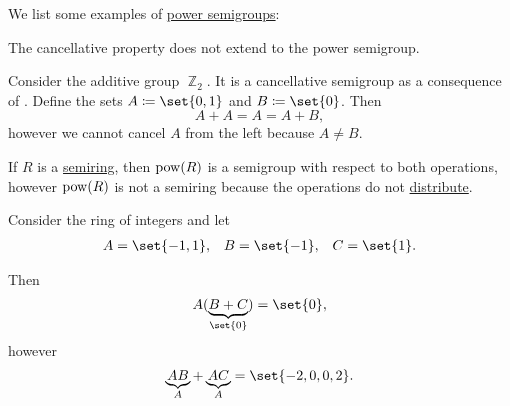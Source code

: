 \begin{example}\label{ex:def:power_semigroup}
  We list some examples of \hyperref[def:power_semigroup]{power semigroups}:
  \begin{thmenum}
     The cancellative property does not extend to the power semigroup.

    Consider the additive group \hyperref[def:group_of_integers_modulo]{\( \BbbZ_2 \)}. It is a cancellative semigroup as a consequence of . Define the sets \( A \coloneqq \set{ 0, 1 } \) and \( B \coloneqq \set{ 0 } \). Then
    \begin{equation*}
      A + A = A = A + B,
    \end{equation*}
    however we cannot cancel \( A \) from the left because \( A \neq B \).

     If \( R \) is a \hyperref[def:semiring]{semiring}, then \( \operatorname{pow}(R) \) is a semigroup with respect to both operations, however \( \operatorname{pow}(R) \) is not a semiring because the operations do not \hyperref[def:semiring/left_distributivity]{distribute}.

    Consider the ring of integers and let
    \begin{align*}
      A = \set{ -1, 1 },
      &&
      B = \set{ -1 },
      &&
      C = \set{ 1 }.
    \end{align*}

    Then
    \begin{equation*}
      A(\underbrace{B + C}_{\set{ 0 }})
      =
      \set{ 0 },
    \end{equation*}
    however
    \begin{equation*}
      \underbrace{AB}_{A} + \underbrace{AC}_{A}
      =
      \set{ -2, 0, 0, 2 }.
    \end{equation*}
  \end{thmenum}
\end{example}

